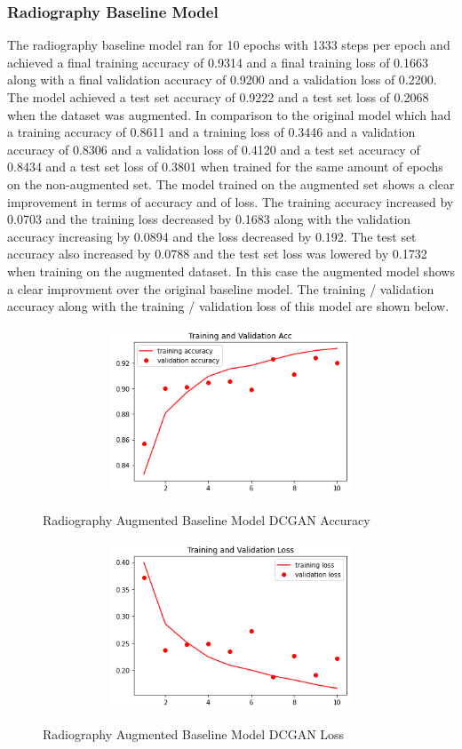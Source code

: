 \subsubsection{Radiography Baseline Model}
The radiography baseline model ran for 10 epochs with 1333 steps per epoch and achieved a final training accuracy of 0.9314 and a final training loss of 0.1663 along with a final validation accuracy of 0.9200 and a validation loss of 0.2200.  The  model achieved a test set accuracy of 0.9222 and a test set loss of 0.2068 when the dataset was augmented.  In comparison to the original model which had a training accuracy of 0.8611 and a training loss of 0.3446 and a validation accuracy of  0.8306 and a validation loss of 0.4120 and a test set accuracy of 0.8434 and a test set loss of 0.3801  when trained for the same amount of epochs on the non-augmented set. The model trained on the augmented set shows a clear improvement in terms of accuracy and of loss.  The training accuracy increased by 0.0703 and the training loss decreased by 0.1683 along with the validation accuracy increasing by 0.0894 and the loss decreased by 0.192. The test set accuracy also increased by 0.0788 and the test set loss was lowered by 0.1732 when training on the augmented dataset.  In this case the augmented model shows a clear improvment over the original baseline model. The training / validation accuracy along with the training / validation loss of this model are shown below.
 \begin{figure}[H]
    \centering    \includegraphics[width=1\textwidth,height=5cm,keepaspectratio]{Images/RadiographyCNNBaselineTrainAndValAccAugmentedDCGAN.png}\\
    \caption{Radiography Augmented Baseline Model DCGAN Accuracy}
    \label{fig:Radiography Augmented Baseline Model DCGAN Accuracy}
\end{figure}
 \begin{figure}[H]
    \centering
    \includegraphics[width=1\textwidth,height=5cm,keepaspectratio]{Images/RadiographyCNNBaselineTrainAndValLossAugmentedDCGAN.png}\\
    \caption{Radiography Augmented Baseline Model DCGAN Loss}
    \label{fig:Radiography Augmented Baseline Model DCGAN Loss}
\end{figure}
